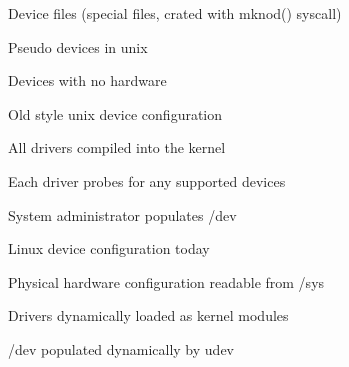 	\enumstart
		\item Device files (special files, crated with mknod() syscall)
	\enumend
	\item Pseudo devices in unix
	\enumstart
		\item Devices with no hardware
	\enumend
	\item Old style unix device configuration
	\enumstart
		\item All drivers compiled into the kernel
		\item Each driver probes for any supported devices
		\item System administrator populates /dev
	\enumend
	\item Linux device configuration today
	\enumstart
		\item Physical hardware configuration readable from /sys
		\item Drivers dynamically loaded as kernel modules 
		\item /dev populated dynamically by udev
	\enumend
\enumend
